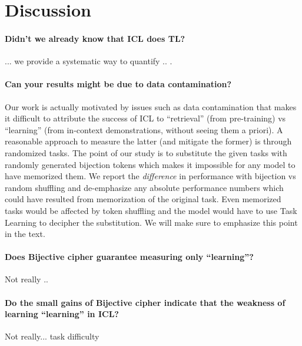\documentclass[11pt]{article}
\newcommand{\daniel}[1]{{\color{purple}[{\bf DK}: #1]}}
\begin{document}



\section{Discussion}

\paragraph{Didn't we already know that ICL does TL?} ... we provide a systematic way to quantify .. .


\paragraph{Can your results might be due to data contamination?}
Our work is actually motivated by issues such as data contamination that makes it difficult to attribute the success of ICL to ``retrieval'' (from pre-training) vs ``learning'' (from in-context demonstrations, without seeing them a priori). A reasonable approach to measure the latter (and mitigate the former) is through randomized tasks. The point of our study is to substitute the given tasks with randomly generated bijection tokens which makes it impossible for any model to have memorized them. We report the \textit{difference} in performance with bijection vs random shuffling and de-emphasize any absolute performance numbers which could have resulted from memorization of the original task. Even memorized tasks would be affected by token shuffling and the model would have to use Task Learning to decipher the substitution. We will make sure to emphasize this point in the text.

\paragraph{Does Bijective cipher guarantee measuring only ``learning''?} Not really ..

\paragraph{Do the small gains of Bijective cipher indicate that the weakness of learning ``learning'' in ICL?} Not really... task difficulty
\end{document}
